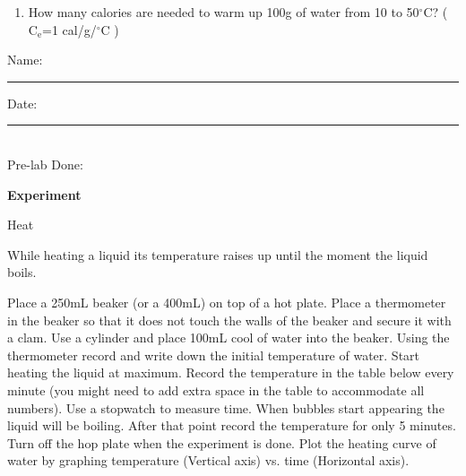 \documentclass[main.tex]{subfiles}
\begin{document}
\begin{fullwidth}
\begin{enumerate}
\item How many calories are needed to warm up 100g of water from 10 to 50$^\circ$C? ($\text{C}_{\text{e}}$=1 cal/g/$^\circ$C )
\vspace{2cm}


\end{enumerate}


\clearpage\mbox{}\clearpage



\begin{multicols}{2}
\begin{tcolorbox}[enhanced jigsaw,breakable,size=title,
colback=mybrown!05,colframe=black,fonttitle=\bfseries,
title=STUDENT INFO,pad at break=1mm, break at=15cm/0pt ]
\vspace{0.2cm}
\noindent Name: \rule{5cm}{0.4pt}Date:\rule{1cm}{0.4pt}\\
Pre-lab Done: \quad
\end{tcolorbox}
\end{multicols}
\hfill
\vspace{0.2cm}
\begin{center}
{\large \bfseries 
Experiment
\par
\Huge
Heat
\\[5pt] \par}
\vspace{0.2cm}
\end{center}
\par
\noindent
\uline{  \hfill \normalsize \hfill       }

\vspace{0.2cm}{\large \bfseries 1. Heating curve for water}
While heating a liquid its temperature raises up until the moment the liquid boils.
\begin{steps}
    \newstep[] Place a 250mL beaker (or a 400mL) on top of a hot plate. Place a thermometer in the beaker so that it does not touch the walls of the beaker and secure it with a clam.
    \newstep[] Use a cylinder and place 100mL cool of water into the beaker.
    \newstep[] Using the thermometer record and write down the initial temperature of water.
    \newstep[] Start heating the liquid at maximum.
    \newstep[] Record the temperature in the table below every minute (you might need to add extra space in the table to accommodate all numbers). Use a stopwatch to measure time.
    \newstep[] When bubbles start appearing the liquid will be boiling. After that point record the temperature for only 5 minutes.
    \newstep[] Turn off the hop plate when the experiment is done.
        \newstep[] Plot the heating curve of water by graphing temperature (Vertical axis) vs. time (Horizontal axis).


\end{steps}
\end{fullwidth}
\end{document}
